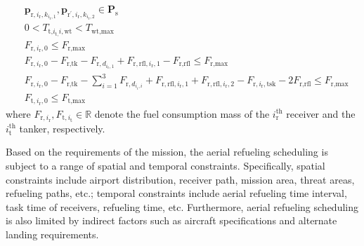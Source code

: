 \begin{subequations}
	\begin{align}
	&\mathbf{p}_{\text{r},i_{\text{r}},k_{i_{\text{r}},1}},\mathbf{p}_{\text{r}^{\prime},i_{\text{r}},k_{i_{\text{r}},2}}\in\mathbf{P}_{\text{s}}\label{eq:15.33a} \\
	&0<T_{\text{t,}i_{\text{t,}}i,\text{wt}}<T_{\text{wt,max}} \label{eq:15.33b}\\
	&F_{\text{r},i_{\text{r}},0}\leq F_{\text{r},\text{max}}\label{eq:15.33c}\\
	&F_{\text{r},i_{\text{r}},0}-F_{\text{r},\text{t}\text{k}}-F_{\text{r},d_{i_{\text{r}},1}}+F_{\text{r},\text{r}\text{f}\text{l},i_{\text{r}},1}-F_{\text{r},\text{r}\text{fl}}\leq F_{\text{r},\text{max}}\label{eq:15.33d}\\
	&F_{\text{r},i_{\text{r}},0}-F_{\text{r},\text{t}\text{k}}-\sum_{i=1}^{3}F_{\text{r},d_{i_{i},i}}+F_{\text{r},\text{r}\text{fl},i_{\text{r}},1}+F_{\text{r},\text{rfl},i_{\text{r}},2}-F_{\text{r},i_{\text{r}},\text{tsk}}-2F_{\text{r},\text{rfl}}\leq F_{\text{r},\text{max}}\label{eq:15.33e}\\
	&F_{\text{t},i_{\text{r}},0}\leq F_{\text{t},\text{max}}\label{eq:15.33f}
	\end{align}
	\label{eq:15.33}
\end{subequations}
where $F_{\text{r},i_{\text{r}}},F_{\text{t},i_{\text{t}}}\in\mathbb{R}$  denote the fuel consumption mass of the $i_{\text{r}}^{\text{th}}$  receiver and the  $i_{\text{t}}^{\text{th}}$ tanker, respectively.

Based on the requirements of the mission, the aerial refueling scheduling is subject to a range of spatial and temporal constraints. Specifically, spatial constraints include airport distribution, receiver path, mission area, threat areas, refueling paths, etc.; temporal constraints include aerial refueling time interval, task time of receivers, refueling time, etc. Furthermore, aerial refueling scheduling is also limited by indirect factors such as aircraft specifications and alternate landing requirements.

